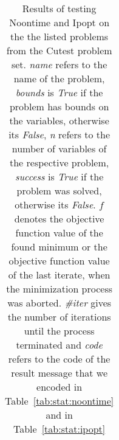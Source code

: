 \begin{longtable}{ccccccccccc}
\caption{Results of testing Noontime and Ipopt on the the listed problems from the Cutest problem set.
\textit{name} refers to the name of the problem, \textit{bounds} is \textit{True} if the problem has bounds on the variables, otherwise its \textit{False}, \textit{n} refers to the number of variables of the respective problem, \textit{success} is \textit{True} if the problem was solved, otherwise its \textit{False}. $f$ denotes the objective function value of the found minimum or the objective function value of the last iterate, when the minimization process was aborted. \textit{\#iter} gives the number of iterations until the process terminated and \textit{code} refers to the code of the result message that we encoded in Table~\ref{tab:stat:noontime} and in Table~\ref{tab:stat:ipopt}}
\end{longtable}